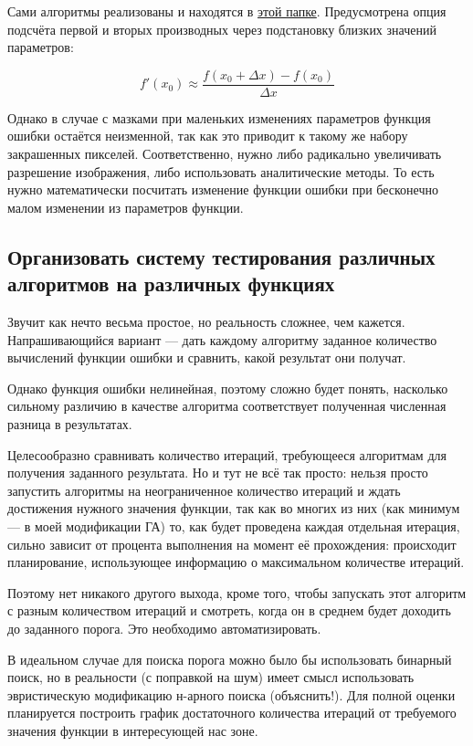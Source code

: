 Сами алгоритмы реализованы и находятся в \href{https://github.com/donRumata03/PowerfulGA/blob/master/other_optimization/local_optimization.cpp}{этой папке}.
Предусмотрена опция подсчёта первой и вторых производных через подстановку близких значений параметров:

\begin{equation}
    f'(x_0) \approx \frac{f(x_0 + \Delta x) - f(x_0)}{\Delta x}
\end{equation}

Однако в случае с мазками при маленьких изменениях параметров функция ошибки остаётся неизменной, так как это приводит к такому же набору закрашенных пикселей.
Соответственно, нужно либо радикально увеличивать разрешение изображения, либо использовать аналитические методы.
То есть нужно математически посчитать изменение функции ошибки при бесконечно малом изменении из параметров функции.

\subsection{Организовать систему тестирования различных алгоритмов на различных функциях}\label{itm:testing_system}
Звучит как нечто весьма простое, но реальность сложнее, чем кажется.
Напрашивающийся вариант — дать каждому алгоритму заданное количество вычислений функции ошибки и сравнить, какой результат они получат.

Однако функция ошибки нелинейная, поэтому сложно будет понять,
насколько сильному различию в качестве алгоритма соответствует полученная численная разница в результатах.

Целесообразно сравнивать количество итераций, требующееся алгоритмам для получения заданного результата.
Но и тут не всё так просто: нельзя просто запустить алгоритмы на неограниченное количество итераций
и ждать достижения нужного значения функции,
так как во многих из них (как минимум — в моей модификации ГА) то,
как будет проведена каждая отдельная итерация, сильно зависит от процента выполнения на момент её прохождения:
происходит планирование,  использующее информацию о максимальном количестве итераций.

Поэтому нет никакого другого выхода, кроме того, чтобы запускать этот алгоритм с разным количеством итераций и смотреть, когда он в среднем будет доходить до заданного порога.
Это необходимо автоматизировать.

В идеальном случае для поиска порога можно было бы использовать бинарный поиск, но в реальности (с поправкой на шум) имеет смысл использовать эвристическую модификацию н-арного поиска (объяснить!).
Для полной оценки планируется построить график достаточного количества итераций от требуемого значения функции в интересующей нас зоне.


